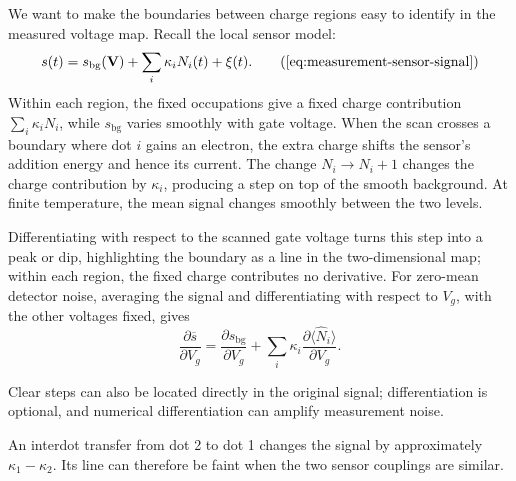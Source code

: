 We want to make the boundaries between charge regions easy to
identify in the measured voltage map. Recall the local sensor model:
\begin{equation*}
 s(t)=s_{\mathrm{bg}}(\mathbf V)
         +\sum_i\kappa_i N_i(t)+\xi(t).
 \tag{\ref*{eq:measurement-sensor-signal}}
\end{equation*}
Within each region, the fixed occupations give a fixed charge
contribution $\sum_i\kappa_iN_i$, while $s_{\mathrm{bg}}$ varies
smoothly with gate voltage. When the scan crosses a boundary where
dot $i$ gains an electron, the extra charge shifts the sensor's
addition energy and hence its current. The change $N_i\to N_i+1$
changes the charge contribution by $\kappa_i$, producing a step on
top of the smooth background. At finite temperature, the mean
signal changes smoothly between the two levels.

Differentiating with respect to the scanned gate voltage turns
this step into a peak or dip, highlighting the boundary as a line
in the two-dimensional map; within each region, the fixed charge
contributes no derivative. For zero-mean detector noise, averaging
the signal and differentiating with respect to $V_g$, with the
other voltages fixed, gives
\begin{equation}
 \frac{\partial\overline s}{\partial V_g}
   =\frac{\partial s_{\mathrm{bg}}}{\partial V_g}
      +\sum_i\kappa_i
          \frac{\partial\langle\widehat N_i\rangle}{\partial V_g}.
 \label{eq:measurement-csd-response}
\end{equation}

Clear steps can also be located directly in the original signal;
differentiation is optional, and numerical differentiation can
amplify measurement noise.

An interdot transfer from dot 2 to dot 1 changes the signal by
approximately $\kappa_1-\kappa_2$. Its line can therefore be faint
when the two sensor couplings are similar.

